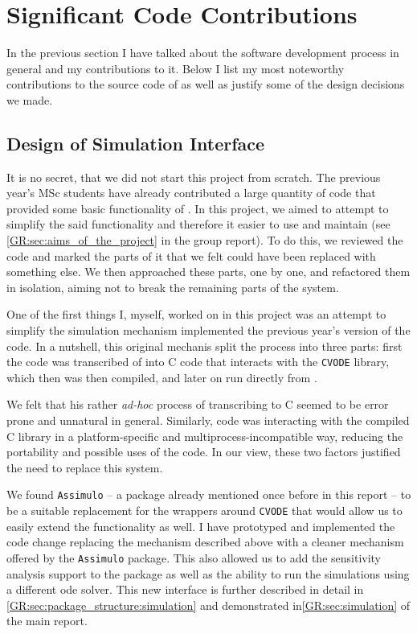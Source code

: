 \section{Significant Code Contributions}

In the previous section I have talked about the software development process in general and my contributions to it. 
Below I list my most noteworthy contributions to the source code of \means{} as well as justify some of the design decisions we made.

\subsection{Design of Simulation Interface}
\label{sec:simulation}

It is no secret, that we did not start this project from scratch.
The previous year's MSc students have already contributed a large quantity of \py{} code that provided some basic functionality of \means{}. In this project, we aimed to attempt to simplify the said functionality and therefore it easier to use and maintain (see \autoref*{GR:sec:aims_of_the_project} in the group report).
To do this, we reviewed the code and marked the parts of it that we felt could have been replaced with something else. 
We then approached these parts, one by one, and refactored them in isolation, aiming not to break the remaining parts of the system.

One of the first things I, myself, worked on in this project was an attempt to simplify the simulation mechanism implemented the previous year's version of the code. In a nutshell, this original mechanis split the process into three parts: first the \python{} code was transcribed of into C code that interacts with the \verb"CVODE" library\cite{hindmarsh_sundials_2005}, which then was then compiled, and later on run directly from \py{}.

We felt that his rather \emph{ad-hoc} process of transcribing \py{} to C seemed to be error prone and unnatural in general. 
Similarly, \py{} code was interacting with the compiled C library in a platform-specific and multiprocess-incompatible way, reducing the portability and possible uses of the code. In our view, these two factors justified the need to replace this system.

We found \verb"Assimulo" -- a package already mentioned once before in this report -- to be a suitable replacement for the wrappers around \verb"CVODE" that would allow us to easily extend the functionality as well. 
I have prototyped and implemented the code change replacing the mechanism described above with a cleaner mechanism offered by the \verb"Assimulo" package. This also allowed us to add the sensitivity analysis support to the \means{} package as well as the ability to run the simulations using a different \gls{ode} solver.
This new interface is further described in detail in \autoref*{GR:sec:package_structure:simulation} and demonstrated in\autoref*{GR:sec:simulation} of the main report.

